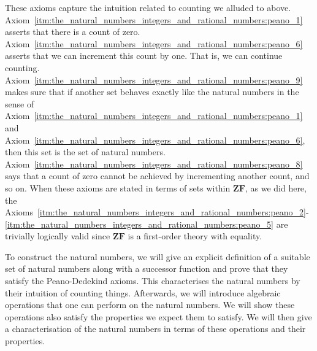 \documentclass[../main.tex]{subfiles}
\begin{document}
These axioms capture the intuition related to counting we alluded to above. Axiom~\ref{itm:the_natural_numbers_integers_and_rational_numbers:peano_1} asserts that there is a count of zero. Axiom~\ref{itm:the_natural_numbers_integers_and_rational_numbers:peano_6} asserts that we can increment this count by one. That is, we can continue counting. Axiom~\ref{itm:the_natural_numbers_integers_and_rational_numbers:peano_9} makes sure that if another set behaves exactly like the natural numbers in the sense of Axiom~\ref{itm:the_natural_numbers_integers_and_rational_numbers:peano_1} and Axiom~\ref{itm:the_natural_numbers_integers_and_rational_numbers:peano_6}, then this set is the set of natural numbers. Axiom~\ref{itm:the_natural_numbers_integers_and_rational_numbers:peano_8} says that a count of zero cannot be achieved by incrementing another count, and so on. When these axioms are stated in terms of sets within $\mathbf{ZF}$, as we did here, the Axioms~\ref{itm:the_natural_numbers_integers_and_rational_numbers:peano_2}\nobreakdashes-\ref{itm:the_natural_numbers_integers_and_rational_numbers:peano_5} are trivially logically valid since $\mathbf{ZF}$ is a first-order theory with equality.

To construct the natural numbers, we will give an explicit definition of a suitable set of natural numbers along with a successor function and prove that they satisfy the Peano-Dedekind axioms. This characterises the natural numbers by their intuition of counting things. Afterwards, we will introduce algebraic operations that one can perform on the natural numbers. We will show these operations also satisfy the properties we expect them to satisfy. We will then give a characterisation of the natural numbers in terms of these operations and their properties.
\end{document}
